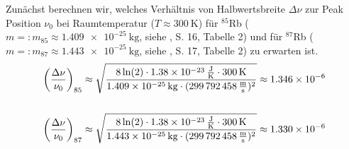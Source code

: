 \begin{appendix}
\noindent Zunächst berechnen wir, welches Verhältnis von Halbwertsbreite $\Delta \nu$ zur Peak Position $\nu_{0}$ bei Raumtemperatur ($T \approx \SI{300}{\kelvin}$) für $^{85}$Rb ($m =: m_{85} \approx \SI{1,409e-25}{\kilogram}$, siehe \cite{Steck85}, S. 16, Tabelle 2) und für $^{87}$Rb ($m =: m_{87} \approx \SI{1,443e-25}{\kilogram}$, siehe \cite{Steck87}, S. 17, Tabelle 2) zu erwarten ist.
\begin{align*}
    \biggl(\frac{\Delta \nu}{\nu_{0}}\biggr)_{85} & \approx \sqrt{\frac{8 \ln(2) \cdot  \SI{1,38e-23}{\frac{\joule}{\kelvin} \cdot \SI{300}{\kelvin}}}{\SI{1,409e-25}{\kilogram} \cdot (\SI{299792458}{\frac{\meter}{\second}})^2}} \approx \SI{1,346e-6}{}\\ \\
    \biggl(\frac{\Delta \nu}{\nu_{0}}\biggr)_{87} & \approx \sqrt{\frac{8 \ln(2) \cdot  \SI{1,38e-23}{\frac{\joule}{\kelvin} \cdot \SI{300}{\kelvin}}}{\SI{1,443e-25}{\kilogram} \cdot (\SI{299792458}{\frac{\meter}{\second}})^2}} \approx \SI{1,330e-6}{}
\end{align*}

\end{appendix}

